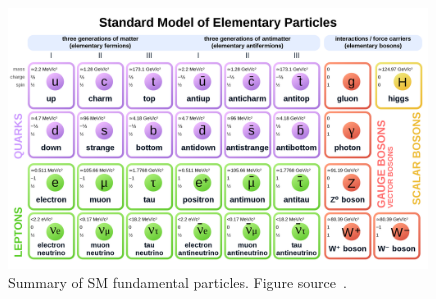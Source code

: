 
\begin{figure}[t!]
\centering
\includegraphics[width=0.99\textwidth]{figures/SMtable.png}
\caption[Summary of standard model fundamental particles]{Summary of SM fundamental particles. Figure source~\cite{SMtable}.
\label{fig:SMParticles}}
\end{figure}

